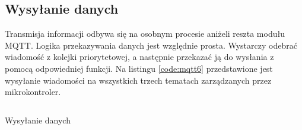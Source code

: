         

        \subsection{Wysyłanie danych}
        Transmisja informacji odbywa się na osobnym procesie aniżeli reszta modułu MQTT. Logika przekazywania danych jest względnie prosta. Wystarczy odebrać wiadomość z kolejki priorytetowej, a następnie przekazać ją do wysłania z pomocą odpowiedniej funkcji. Na listingu \ref{code:mqtt6} przedstawione jest wysyłanie wiadomości na wszystkich trzech tematach zarządzanych przez mikrokontroler.
        
        \begin{kod}
            \inputminted[firstline=46, lastline=71]{cpp}{esp/listings/mqtt.cpp}
            \caption{Wysyłanie danych}
            \label{code:mqtt6}
            \vspace{2em}
        \end{kod}